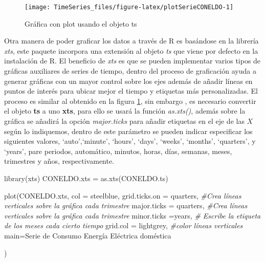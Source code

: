 \documentclass[
  spanish,
]{book}
\newenvironment{Shaded}{\begin{snugshade}}{\end{snugshade}}
\newcommand{\AttributeTok}[1]{\textcolor[rgb]{0.77,0.63,0.00}{#1}}
\newcommand{\CommentTok}[1]{\textcolor[rgb]{0.56,0.35,0.01}{\textit{#1}}}
\newcommand{\FunctionTok}[1]{\textcolor[rgb]{0.00,0.00,0.00}{#1}}
\newcommand{\NormalTok}[1]{#1}
\newcommand{\OtherTok}[1]{\textcolor[rgb]{0.56,0.35,0.01}{#1}}
\newcommand{\StringTok}[1]{\textcolor[rgb]{0.31,0.60,0.02}{#1}}
\theoremstyle{remark}
\begin{document}
\begin{figure}

{\centering \texttt{[image: TimeSeries\_files/figure-latex/plotSerieCONELDO-1]} 

}

\caption{Gráfica con plot usando el objeto ts}\label{fig:plotSerieCONELDO}
\end{figure}

Otra manera de poder graficar los datos a través de R es basándose en la librería \emph{xts}, este paquete incorpora una extensión al objeto \emph{ts} que viene por defecto en la instalación de R. El beneficio de \emph{xts} es que se pueden implementar varios tipos de gráficas auxiliares de series de tiempo, dentro del proceso de graficación ayuda a generar gráficas con un mayor control sobre los ejes además de añadir líneas en puntos de interés para ubicar mejor el tiempo y etiquetas más personalizadas. El proceso es similar al obtenido en la figura \ref{fig:plotSerieCONELDO}, sin embargo , es necesario convertir el objeto \textbf{ts} a uno \textbf{xts}, para ello se usará la función \emph{as.xts()}, además sobre la gráfica se añadirá la opción \emph{major.ticks} para añadir etiquetas en el eje de las \(X\) según lo indiquemos, dentro de este parámetro se pueden indicar especificar los siguientes valores, `auto',`minute', `hours', `days', `weeks', `months', `quarters', y `years', pare periodos, automático, minutos, horas, días, semanas, meses, trimestres y años, respectivamente.

\begin{Shaded}
\begin{Highlighting}[]
\FunctionTok{library}\NormalTok{(xts)}
\NormalTok{CONELDO.xts }\OtherTok{=} \FunctionTok{as.xts}\NormalTok{(CONELDO.ts)}

\FunctionTok{plot}\NormalTok{(CONELDO.xts, }\AttributeTok{col =} \StringTok{\textquotesingle{}steelblue\textquotesingle{}}\NormalTok{, }
     \AttributeTok{grid.ticks.on =} \StringTok{\textquotesingle{}quarters\textquotesingle{}}\NormalTok{, }\CommentTok{\#Crea líneas verticales sobre la gráfica cada trimestre}
     \AttributeTok{major.ticks =} \StringTok{\textquotesingle{}quarters\textquotesingle{}}\NormalTok{,  }\CommentTok{\#Crea líneas verticales sobre la gráfica cada trimestre}
     \AttributeTok{minor.ticks =}\StringTok{\textquotesingle{}years\textquotesingle{}}\NormalTok{, }\CommentTok{\# Escribe la etiqueta de los meses cada cierto tiempo}
     \AttributeTok{grid.col =} \StringTok{\textquotesingle{}lightgrey\textquotesingle{}}\NormalTok{, }\CommentTok{\#color líneas verticales}
     \AttributeTok{main=}\StringTok{\textquotesingle{}Serie de Consumo Energía Eléctrica doméstica\textquotesingle{}}
     
\NormalTok{     )}
\end{Highlighting}
\end{Shaded}
\end{document}
